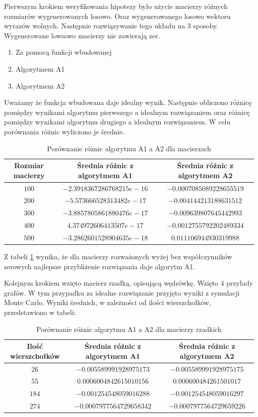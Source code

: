 \documentclass[12pt,a4paper]{article}
\begin{document}
Pierwszym krokiem weryfikowania hipotezy było użycie macierzy różnych rozmiarów wygenerowanych losowo. Oraz wygenerowanego losowo wektoru wyrazów wolnych. Następnie rozwiązywanie tego układu na 3 sposoby. Wygenerowane lowsowo macierzy nie zawierają zer.
\begin{enumerate}
    \item Za pomocą funkcji wbudowanej
    \item Algorytmem A1
    \item Algorytmem A2
\end{enumerate}
Uważamy że funkcja wbudowana daje idealny wynik. Następnie obliczono różnicę pomiędzy wynikami algorytmu pierwszego a idealnym rozwiązaniem oraz różnicę pomiędzy wynikami algorytmu drugiego a idealnym rozwiązaniem. W celu porównania różnic wyliczono je średnie. 
\begin{table}[h]
\centering
\begin{tabular}{|c|c|c|}
\hline
Rozmiar macierzy & Średnia różnic z algorytmem A1 & Średnia różnic z algorytmem A2  \\
\hline
$100$ & $-2.3918367286768215e-16$ & $-0.0007085089228655519$\\
$200$ & $-5.573666528313482e-17$ & $-0.004144213188631512$\\
$300$ & $-3.8857805861880476e-17$ & $-0.009639807645442993$ \\
$400$ & $4.374972606413507e-17$ & $-0.0012755792202489334 $ \\
$500$ & $-3.2862601528904635e-18$ & $0.011106944930319988$ \\
\hline
\end{tabular}
\caption{Porównanie różnic algorytmu A1 a A2 dla macierzach}
\label{tab:roznicy1}
\end{table}
Z tabeli \ref{tab:roznicy1} wynika, że dla macierzy rozważonych wyżej bez współczynników zerowych najlepsze przybliżenie rozwiązania daje algorytm A1.

Kolejnym krokiem wzięto macierz rzadką, opisującą wędrówkę. Wzięto 4 przyłady grafów. W tym przypadku za idealne rozwiązanie przyjęto wyniki z symulacji Monte Carlo. Wyniki średnich, w zależności od ilości wierszchołków, przedstawiono w tabeli:

\begin{table}[h]
\centering
\begin{tabular}{|c|c|c|}
\hline
Ilość wierszchołków & Średnia różnic z algorytmem A1 & Średnia różnic z algorytmem A2  \\
\hline
$26$ &  $-0.005589991928975173$ & $-0.005589991928975175$\\
$55$ & $0.0006004842615010156$ & $ 0.000600484261501017$\\
$184$ & $-0.001254548059016288$ & $-0.001254548059016297$ \\
$274$ & $-0.0007977564729658342$ & $-0.0007977564729659226$ \\
\hline
\end{tabular}
\caption{Porównanie różnic algorytmu A1 a A2 dla macierzy rzadkich}
\label{tab:roznicy2}
\end{table}
\end{document}
